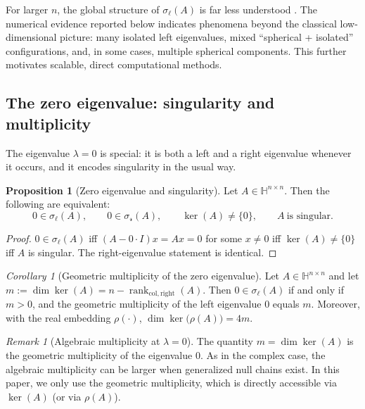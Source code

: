 \documentclass[preprint,12pt]{elsarticle}  %
\theoremstyle{definition}
\theoremstyle{definition}
\theoremstyle{definition}
\theoremstyle{definition}
\theoremstyle{definition}
\newtheorem{Pro}{Proposition}
\theoremstyle{remark}
\newtheorem{Rem}{Remark}
\theoremstyle{remark}
\theoremstyle{remark}
\newtheorem{Cor}{Corollary}
\newcommand{\err}{\ensuremath{ \mathscr{r} }}
\newcommand{\HH}{\mathbb{H}}
\DeclareMathOperator{\rank}{rank}
\begin{document}
For larger $n$, the global structure of $\sigma_\ell(A)$ is far less understood \cite{MaciasVirgosPereiraSaez2014,Rodman2014}. The numerical evidence reported below indicates phenomena beyond the classical low-dimensional picture: many isolated left eigenvalues, mixed ``spherical + isolated'' configurations, and, in some cases, multiple spherical components. This further motivates scalable, direct computational methods.


\subsection{The zero eigenvalue: singularity and multiplicity}
\label{subsec_zero_left_eig_mult}
The eigenvalue $\lambda=0$ is special: it is both a left and a right eigenvalue whenever it occurs, and it encodes
singularity in the usual way.

\begin{Pro}[Zero eigenvalue and singularity]
\label{pro_zero_left_right_singularity}
Let $A\in\HH^{n\times n}$. Then the following are equivalent:
\[
0\in\sigma_\ell(A),\qquad 0\in\sigma_\err(A),\qquad \ker(A)\neq\{0\},\qquad A\ \text{is singular}.
\]
\end{Pro}
\begin{proof}
$0\in\sigma_\ell(A)$ iff $(A-0\cdot I)x=Ax=0$ for some $x\neq0$ iff $\ker(A)\neq\{0\}$ iff $A$ is singular.
The right-eigenvalue statement is identical.
\end{proof}

\begin{Cor}[Geometric multiplicity of the zero eigenvalue]
\label{cor_zero_left_geom_mult}
Let $A\in\HH^{n\times n}$ and let $m:=\dim\ker(A)=n-\rank_{\mathrm{col,right}}(A)$.
Then $0\in\sigma_\ell(A)$ if and only if $m>0$, and the geometric multiplicity of the left eigenvalue $0$ equals $m$.
Moreover, with the real embedding $\rho(\cdot)$,
$\dim\ker\bigl(\rho(A)\bigr)=4m$.
\end{Cor}

\begin{Rem}[Algebraic multiplicity at $\lambda=0$]
\label{rem_zero_alg_mult}
The quantity $m=\dim\ker(A)$ is the geometric multiplicity of the eigenvalue $0$.
As in the complex case, the algebraic multiplicity can be larger when generalized null chains exist.
In this paper, we only use the geometric multiplicity, which is directly accessible via $\ker(A)$ (or via $\rho(A)$).
\end{Rem}
\end{document}
